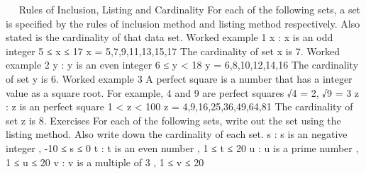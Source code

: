 \documentclass[11pt,a4paper,titlepage,oneside,openany]{article}
\numberwithin{equation}{section}
\numberwithin{algorithm}{section}
\numberwithin{figure}{section}
\numberwithin{table}{section}
\begin{document}
 
Rules of Inclusion, Listing and Cardinality
For each of the following sets, a set is specified by the rules of inclusion method and listing method respectively. Also stated is the cardinality of that data set.
Worked example 1
{ x : x  is an odd integer  5 ≤ x ≤ 17 }
x = {5,7,9,11,13,15,17}
The cardinality of set x is 7.
Worked example 2
{ y : y  is an even integer  6 ≤ y < 18 }
y = {6,8,10,12,14,16}
The cardinality of set y is 6.
Worked example 3
A perfect square is a number that has a integer value as a square root. For example, 4 and 9 are perfect squares √4  = 2, √9  = 3
{ z : z  is an perfect square  1 < z < 100 }
z = {4,9,16,25,36,49,64,81}
The cardinality of set z is 8.
Exercises
For each of the following sets, write out the set using the listing method.
Also write down the cardinality of each set.
{ s : s  is an negative integer , -10 ≤ s ≤ 0 }
{ t : t  is an even number , 1 ≤ t ≤ 20 }
{ u : u  is a prime number , 1 ≤ u ≤ 20 }
{ v : v  is a multiple of 3 , 1 ≤ v ≤ 20 }
\end{document}
